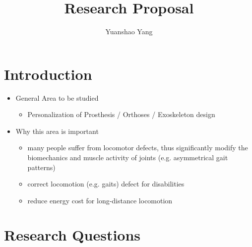 \documentclass[8pt]{article}
\title{Research Proposal}
\author{Yuanshao Yang}
\affil{Department of Mechanical Engineering, Univereity of Michigan}
\date{}
\begin{document}
\maketitle


\section{Introduction}
\begin{itemize}
    \item General Area to be studied
    \begin{itemize}
        \item Personalization of Prosthesis / Orthoses / Exoskeleton design \cite{PersonalizeMain}
    \end{itemize}
    \item Why this area is important
    \begin{itemize}
        \item many people suffer from locomotor defects, thus significantly modify the biomechanics and muscle activity of joints (e.g. asymmetrical gait patterns) \cite{GaitAdjustment}
        \item correct locomotion (e.g. gaits) defect for disabilities \cite{GaitCorrection}
        \item reduce energy cost for long-distance locomotion \cite{ReduceEnergyCost}
    \end{itemize}
\end{itemize}



\section{Research Questions}
\end{document}
